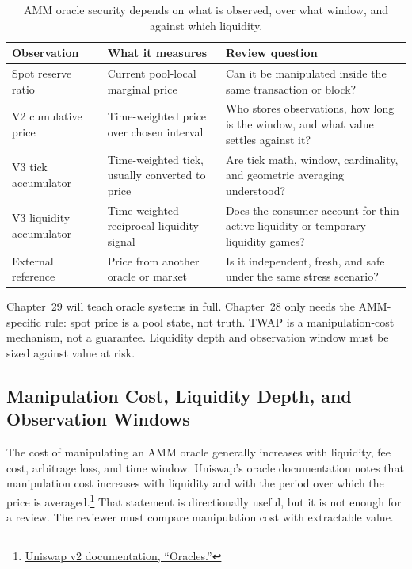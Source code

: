 \begin{table}[htbp]
\centering
\small
\renewcommand{\arraystretch}{1.16}
\begin{tabularx}{\textwidth}{@{}>{\RaggedRight\arraybackslash}p{}>{\RaggedRight\arraybackslash}p{}X@{}}
\toprule
Observation & What it measures & Review question \\
\midrule
Spot reserve ratio & Current pool-local marginal price & Can it be manipulated inside the same transaction or block? \\
V2 cumulative price & Time-weighted price over chosen interval & Who stores observations, how long is the window, and what value settles against it? \\
V3 tick accumulator & Time-weighted tick, usually converted to price & Are tick math, window, cardinality, and geometric averaging understood? \\
V3 liquidity accumulator & Time-weighted reciprocal liquidity signal & Does the consumer account for thin active liquidity or temporary liquidity games? \\
External reference & Price from another oracle or market & Is it independent, fresh, and safe under the same stress scenario? \\
\bottomrule
\end{tabularx}
\caption{AMM oracle security depends on what is observed, over what window, and against which liquidity.}
\end{table}

Chapter~29 will teach oracle systems in full. Chapter~28 only needs the AMM-specific rule: spot price is a pool state, not truth. TWAP is a manipulation-cost mechanism, not a guarantee. Liquidity depth and observation window must be sized against value at risk.

\subsection{Manipulation Cost, Liquidity Depth, and Observation Windows}

The cost of manipulating an AMM oracle generally increases with liquidity, fee cost, arbitrage loss, and time window. Uniswap's oracle documentation notes that manipulation cost increases with liquidity and with the period over which the price is averaged.\footnote{\href{https://developers.uniswap.org/docs/protocols/v2/concepts/oracles}{Uniswap v2 documentation, ``Oracles.''}} That statement is directionally useful, but it is not enough for a review. The reviewer must compare manipulation cost with extractable value.

